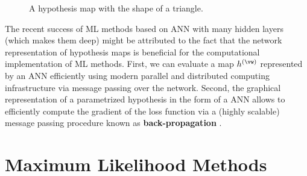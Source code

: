 \documentclass[12pt]{report}
\begin{document}
\begin{figure}[htbp]
\begin{center}
     \vspace*{-10mm}
\end{center}
\caption{A hypothesis map with the shape of a triangle.}
\label{fig_triangle}
\end{figure}

The recent success of ML methods based on ANN with many hidden layers 
(which makes them deep) might be attributed to the fact that the network 
representation of hypothesis maps is beneficial for the computational 
implementation of ML methods. First, we can evaluate a map $h^{(\vw)}$ represented 
by an ANN efficiently using modern parallel and distributed computing 
infrastructure via message passing over the network. Second, the 
graphical representation of a parametrized hypothesis in the form 
of a ANN allows to efficiently compute the gradient of the loss function 
via a (highly scalable) message passing procedure known as {\bf back-propagation} \cite{Goodfellow-et-al-2016}.

\section{Maximum Likelihood Methods}
\label{sec_max_iikelihood}
\end{document}
